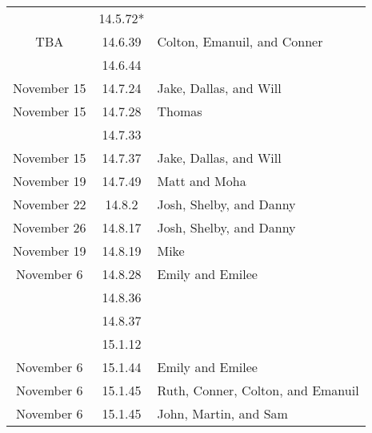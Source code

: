 \documentclass[12pt]{amsart}
\begin{document}
\begin{longtable}{c|c|l}
                        & 14.5.72*                             &                                          \\
        TBA             & 14.6.39                              & Colton, Emanuil, and Conner              \\
                        & 14.6.44                              &                                          \\
        November 15     & 14.7.24                              & Jake, Dallas, and Will                   \\
        November 15     & 14.7.28                              & Thomas                                   \\
                        & 14.7.33                              &                                          \\
        November 15     & 14.7.37                              & Jake, Dallas, and Will                   \\
        November 19     & 14.7.49                              & Matt and Moha                            \\
        November 22     & 14.8.2                               & Josh, Shelby, and Danny                  \\
        November 26     & 14.8.17                              & Josh, Shelby, and Danny                  \\
        November 19     & 14.8.19                              & Mike                                     \\
        November 6      & 14.8.28                              & Emily and Emilee                         \\
                        & 14.8.36                              &                                          \\
                        & 14.8.37                              &                                          \\
                        & 15.1.12                              &                                          \\
        November 6      & 15.1.44                              & Emily and Emilee                         \\
        November 6      & 15.1.45                              & Ruth, Conner, Colton, and Emanuil        \\
        November 6      & 15.1.45                              & John, Martin, and Sam                    \\

\end{longtable}
\end{document}
